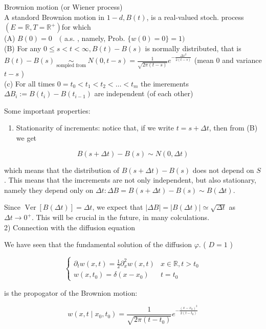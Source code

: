 \documentclass[10pt]{article}
\begin{document}
Brownion motion (or Wiener process)\\
A standord Brownion motion in $1-d, B(t)$, is a real-valued stoch. process $\left(E=\mathbb{R}, T=\mathbb{R}^{+}\right)$for which\\
(A) $B(0)=0 \quad($ a.s. , namely, Prob. $\{w(0)=0\}=1)$\\
(B) For any $0 \leqslant s<t<\infty, B(t)-B(s)$ is normally distributed, that is $B(t)-B(s) \underset{\text { sompled from }}{\sim} N(0, t-s)=\frac{1}{\sqrt{2 \pi(t-s)}} e^{-\frac{\Delta x^{2}}{2(t-s)}}$ (mean 0 and variance $t-s$ )\\
(c) For all times $0=t_{0}<t_{1}<t_{2}<\ldots<t_{m}$ the imerements $\Delta B_{i}:=B\left(t_{i}\right)-B\left(t_{i-1}\right)$ are independent (of each other)

Some important properties:

\begin{enumerate}
  \item Stationarity of increments: notice that, if we write $t=s+\Delta t$, then from (B) we get
\end{enumerate}

$$
B(s+\Delta t)-B(s) \sim N(0, \Delta t)
$$

which means that the distribution of $B(s+\Delta t)-B(s)$ does not depend on $S$. This means that the imcrements are not only independent, but also stationary, namely they depend only on $\Delta t: \Delta B=B(s+\Delta t)-B(s) \sim B(\Delta t)$.

Since $\operatorname{Ver}[B(\Delta t)]=\Delta t$, we expect that $|\Delta B|=|B(\Delta t)| \simeq \sqrt{\Delta t}$ as $\Delta t \rightarrow 0^{+}$. This will be crucial in the future, in many colculations.\\
2) Connection with the diffusion equation

We have seen that the fundamental solution of the diffusion $\varphi$. ( $D=1$ )

$$
\left\{\begin{array}{cc}
\partial_{t} w(x, t)=\frac{1}{2} \partial_{x}^{2} w(x, t) & x \in \mathbb{R}, t>t_{0} \\
w\left(x, t_{0}\right)=\delta\left(x-x_{0}\right) & t=t_{0}
\end{array}\right.
$$

is the propogator of the Brownion motion:


\begin{equation*}
w\left(x, t \mid x_{0}, t_{0}\right)=\frac{1}{\sqrt{2 \pi\left(t-t_{0}\right)}} e^{-\frac{\left(x-x_{0}\right)^{2}}{2\left(t-t_{0}\right)}} \tag{1}
\end{equation*}
\end{document}
